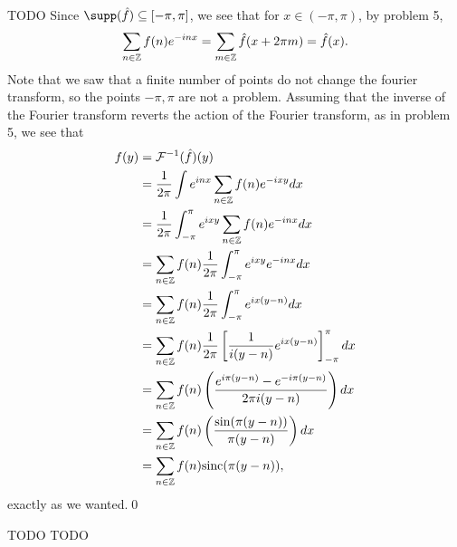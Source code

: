 \documentclass{article}
\begin{document}
\newpage
{} TODO  \tri
\hop 
\solution
Since $\supp(\hat{f}) \sse [-\pi, \pi]$, we see that for $x \in (-\pi,\pi)$, by problem 5,
\begin{align*}
    \sum_{n \in \mathbb{Z}}f(n) e^{-inx} = \sum_{m \in \mathbb{Z}} \hat{f}(x + 2\pi m) = \hat{f}(x).
\end{align*}
Note that we saw that a finite number of points do not change the fourier transform, so the points $-\pi, \pi$ are not a problem. Assuming that the inverse of the Fourier transform reverts the action of the Fourier transform, as in problem 5, we see that 
\begin{align*}
    f(y) &= \cal{F}\inv(\hat{f})(y) \\
    &= \frac{1}{2\pi}\int e^{inx}\sum_{n\in \ZZ} f(n)e^{-ixy}dx \\
    &= \frac{1}{2\pi}\int_{-\pi}^\pi e^{ixy}\sum_{n\in \ZZ} f(n)e^{-inx}dx \\
    &=\sum_{n\in \ZZ} f(n) \frac{1}{2\pi}\int_{-\pi}^\pi e^{ixy}e^{-inx}dx \\
    &=\sum_{n\in \ZZ} f(n) \frac{1}{2\pi}\int_{-\pi}^\pi e^{ix(y-n)}dx \\
    &=\sum_{n\in \ZZ} f(n) \frac{1}{2\pi}\sbr{\frac{1}{i(y-n)}e^{ix(y-n)}}_{-\pi}^\pi dx \\
    &=\sum_{n\in \ZZ} f(n) \del{\frac{e^{i\pi(y-n)}-e^{-i\pi(y-n)}}{2\pi i(y-n)}} dx\\
    &=\sum_{n\in \ZZ} f(n) \del{\frac{\sin(\pi(y-n))}{\pi (y-n)}} dx\\
    &=\sum_{n\in \ZZ} f(n) \text{sinc}(\pi(y-n)),\\
\end{align*}
exactly as we wanted.\qed



\newpage
{} TODO  \tri
\hop 
\solution
TODO
\end{document}

